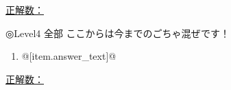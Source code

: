 \documentclass[uplatex,a4j,11pt]{jsarticle}
\begin{document}
\vfill

\begin{flushright}
  \underline{正解数：\hspace{6em}}
\end{flushright}

\newpage

◎Level4 \hfill 全部 \hfill ここからは今までのごちゃ混ぜです！
　
\begin{minipage}[t][8.1cm][t]{\linewidth}
  \begin{multicols}{2}
    \begin{enumerate}
      \item @[item.answer\_text]@
    \end{enumerate}
  \end{multicols}
\end{minipage}

\vfill

\begin{flushright}
  \underline{正解数：\hspace{6em}}
\end{flushright}

\newpage
\end{document}
